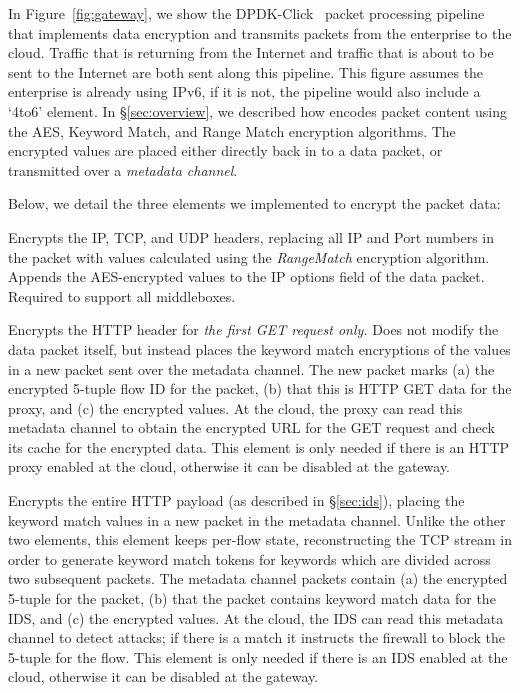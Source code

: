  In Figure~\ref{fig:gateway}, we show the DPDK-Click~\cite{click} packet processing pipeline that implements data encryption and transmits packets from the enterprise to the cloud.
Traffic that is returning from the Internet and traffic that is about to be sent to the Internet are both sent along this pipeline.
This figure assumes the enterprise is already using IPv6, if it is not, the pipeline would also include a `4to6' element.
In \S\ref{sec:overview}, we described how \sys encodes packet content using the AES, Keyword Match, and Range Match encryption algorithms. 
The encrypted values are placed either directly back in to a data packet, or transmitted over a {\it metadata channel}.

Below, we detail the three elements we implemented to encrypt the packet data:

 Encrypts the IP, TCP, and UDP headers, replacing all IP and Port numbers in the packet with values calculated using the {\it RangeMatch} encryption algorithm. Appends the AES-encrypted values to the IP options field of the data packet.
Required to support all middleboxes. 

 Encrypts the HTTP header for {\it the first GET request only.} Does not modify the data packet itself, but instead places the keyword match encryptions of the values in a new packet sent over the metadata channel. 
The new packet marks (a) the encrypted 5-tuple flow ID for the packet, (b) that this is HTTP GET data for the proxy, and (c) the encrypted values. At the cloud, the proxy can read this metadata channel to obtain the encrypted URL for the GET request and check its cache for the encrypted data. This element is only needed if there is an HTTP proxy enabled at the cloud, otherwise it can be disabled at the gateway.

 Encrypts the entire HTTP payload (as described in \S\ref{sec:ids}), placing the keyword match values in a new packet in the metadata channel. Unlike the other two elements, this element keeps per-flow state, reconstructing the TCP stream in order to generate keyword match tokens for keywords which are divided across two subsequent packets.  The metadata channel packets contain (a) the encrypted 5-tuple for the packet, (b) that the packet contains keyword match data for the IDS, and (c) the encrypted values. At the cloud, the IDS can read this metadata channel to detect attacks; if there is a match it instructs the firewall to block the 5-tuple for the flow. This element is only needed if there is an IDS enabled at the cloud, otherwise it can be disabled at the gateway.


